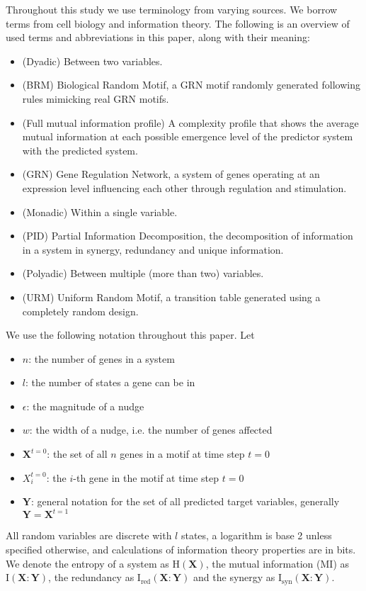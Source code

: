 \documentclass[../main.tex]{subfiles}
\begin{document}
Throughout this study we use terminology from varying sources.
We borrow terms from cell biology and information theory.
The following is an overview of used terms and abbreviations in this paper, along with their meaning:

\begin{itemize}
\item[] (Dyadic) Between two variables.
\item[] (BRM) Biological Random Motif, a GRN motif randomly generated following rules mimicking real GRN motifs.
\item[] (Full mutual information profile) A complexity profile that shows the average mutual information at each possible emergence level of the predictor system with the predicted system.
\item[] (GRN) Gene Regulation Network, a system of genes operating at an expression level influencing each other through regulation and stimulation.
\item[] (Monadic) Within a single variable.
\item[] (PID) Partial Information Decomposition, the decomposition of information in a system in synergy, redundancy and unique information.
\item[] (Polyadic) Between multiple (more than two) variables.
\item[] (URM) Uniform Random Motif, a transition table generated using a completely random design.
\end{itemize}

We use the following notation throughout this paper. Let
\begin{itemize}
\item[] $n$: the number of genes in a system
\item[] $l$: the number of states a gene can be in
\item[] $\epsilon$: the magnitude of a nudge
\item[] $w$: the width of a nudge, i.e. the number of genes affected
\item[] $\mathbf{X}^{t=0}$: the set of all $n$ genes in a motif at time step $t=0$
\item[] $X_i^{t=0}$: the $i$-th gene in the motif at time step $t=0$
\item[] $\mathbf{Y}$: general notation for the set of all predicted target variables, generally $\mathbf{Y} = \mathbf{X}^{t=1}$
\end{itemize}
All random variables are discrete with $l$ states, a logarithm is base 2 unless specified otherwise, and calculations of information theory properties are in bits.
We denote the entropy of a system as $\mathrm{H}(\mathbf{X})$, the mutual information (MI) as $\mathrm{I}(\mathbf{X}:\mathbf{Y})$, the redundancy as $\mathrm{I}_\mathrm{red}(\mathbf{X}:\mathbf{Y})$ and the synergy as $\mathrm{I}_\mathrm{syn}(\mathbf{X}:\mathbf{Y})$.
\end{document}
